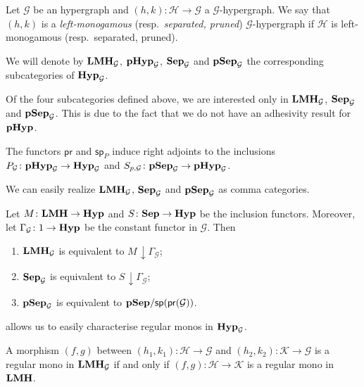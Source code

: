 \documentclass[3p]{elsarticle}
\newcommand{\catname}[1]{\textbf{\textup{#1}}}
\newcommand{\lmo}{\catname{LMH}}
\newcommand{\hyp}{\catname{Hyp}}
\newcommand{\phyp}{\catname{pHyp}}
\newcommand{\pshyp}{\catname{pSep}}
\newcommand{\shyp}{\catname{Sep}}
\renewcommand{\sp}{\mathsf{sp}}
\newcommand{\pr}{\mathsf{pr}}
\renewcommand{\comma}[2]{#1\hspace{1pt} {\downarrow}#2}
\theoremstyle{remark}
\theoremstyle{definition}
\begin{document}
\begin{defi}
	Let $\mathcal{G}$ be an hypergraph and $(h,k)\colon \mathcal{H}\to \mathcal{G}$  a $\mathcal{G}$-hypergraph. We say that $(h,k)$ is a \emph{left-monogamous} (resp.~\emph{separated, pruned}) $\mathcal{G}$-hypergraph if $\mathcal{H}$ is left-monogamous (resp.~separated, pruned).
	
	We will denote by $\lmo_{\mathcal{G}}$, $\phyp_{\mathcal{G}}$, $\shyp_{\mathcal{G}}$ and $\pshyp_{\mathcal{G}}$ the corresponding subcategories of $\hyp_{\mathcal{G}}$.
\end{defi}

\begin{rem}Of the four subcategories  defined above, we are interested only in  $\lmo_{\mathcal{G}}$, $\shyp_{\mathcal{G}}$ and $\pshyp_{\mathcal{G}}$. This is due to the fact that we do not have an adhesivity result for $\phyp$.
\end{rem}

\begin{rem} The functors $\pr$ and $\sp_P$ induce right adjoints to the inclusions $P_\mathcal{G}\colon \phyp_\mathcal{G} \to \hyp_{\mathcal{G}}$ and $S_{p, \mathcal{G}}\colon \pshyp_\mathcal{G}\to \phyp_{\mathcal{G}}$.
\end{rem}
We can easily realize $\lmo_{\mathcal{G}}$, $\shyp_{\mathcal{G}}$ and $\pshyp_{\mathcal{G}}$ as comma categories.

\begin{prop}
Let $M\colon \lmo \to \hyp$ and $S\colon \shyp \to \hyp$ be the inclusion functors. Moreover, let $\Gamma_{\mathcal{G}}\colon 1\to \hyp$ be the constant functor in $\mathcal{G}$. Then
\begin{enumerate}
	\item $\lmo_{\mathcal{G}}$ is equivalent to $\comma{M}{\Gamma_\mathcal{G}}$;
	\item $\shyp_{\mathcal{G}}$ is equivalent to $\comma{S}{\Gamma_\mathcal{G}}$; 
	\item $\pshyp_{\mathcal{G}}$ is equivalent to $\pshyp/\sp(\pr(\mathcal{G}))$. 
\end{enumerate}
\end{prop}

 allows us to easily characterise regular monos in $\hyp_{\mathcal{G}}$.
\begin{prop}
	A morphism $(f,g)$ between $(h_1, k_1)\colon \mathcal{H}\to \mathcal{G}$ and  $(h_2, k_2)\colon \mathcal{K}\to \mathcal{G}$ is a regular mono in $\lmo_{\mathcal{G}}$ if and only if $(f,g)\colon \mathcal{H}\to \mathcal{K}$ is a regular mono in $\lmo$.
\end{prop}
\end{document}
